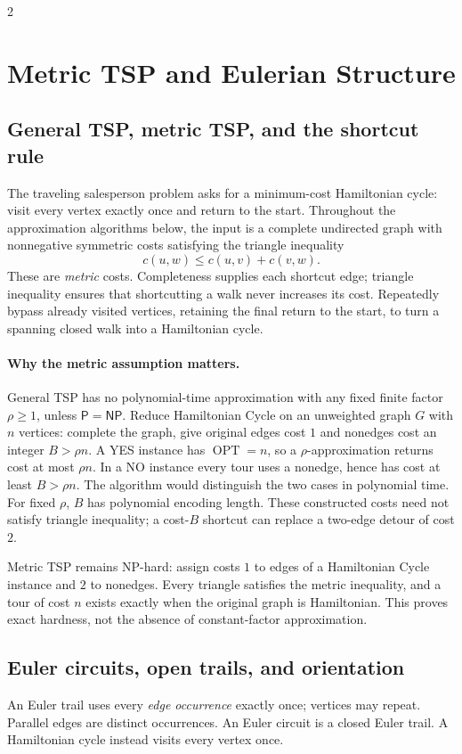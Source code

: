 \documentclass[10pt]{article}
\theoremstyle{definition}
\newcommand{\OPT}{\operatorname{OPT}}
\newcommand{\NP}{\mathsf{NP}}
\newcommand{\PTIME}{\mathsf{P}}
\begin{document}
\begin{multicols*}{2}
\clearpage

\section{Metric TSP and Eulerian Structure}\label{tsp:main}

\subsection{General TSP, metric TSP, and the shortcut rule}
The traveling salesperson problem asks for a minimum-cost Hamiltonian
cycle: visit every vertex exactly once and return to the start.  Throughout
the approximation algorithms below, the input is a complete undirected
graph with nonnegative symmetric costs satisfying the triangle inequality
\[
c(u,w)\le c(u,v)+c(v,w).
\]
These are \emph{metric} costs.  Completeness supplies each shortcut edge;
triangle inequality ensures that shortcutting a walk never increases its
cost.  Repeatedly bypass already visited vertices, retaining the final
return to the start, to turn a spanning closed walk into a Hamiltonian cycle.

\paragraph{Why the metric assumption matters.}
General TSP has no polynomial-time approximation with any fixed finite
factor $\rho\ge1$, unless $\PTIME=\NP$.  Reduce Hamiltonian Cycle on an
unweighted graph $G$ with $n$ vertices: complete the graph, give original
edges cost $1$ and nonedges cost an integer $B>\rho n$.  A YES instance has
$\OPT=n$, so a $\rho$-approximation returns cost at most $\rho n$.  In a NO
instance every tour uses a nonedge, hence has cost at least $B>\rho n$.
The algorithm would distinguish the two cases in polynomial time.  For
fixed $\rho$, $B$ has polynomial encoding length.  These constructed costs
need not satisfy triangle inequality; a cost-$B$ shortcut can replace a
two-edge detour of cost $2$.

Metric TSP remains NP-hard: assign costs $1$ to edges of a Hamiltonian Cycle
instance and $2$ to nonedges.  Every triangle satisfies the metric inequality,
and a tour of cost $n$ exists exactly when the original graph is Hamiltonian.
This proves exact hardness, not the absence of constant-factor approximation.

\subsection{Euler circuits, open trails, and orientation}\label{tsp:euler}
An Euler trail uses every \emph{edge occurrence} exactly once; vertices may
repeat.  Parallel edges are distinct occurrences.  An Euler circuit is a
closed Euler trail.  A Hamiltonian cycle instead visits every vertex once.


\end{multicols*}
\end{document}
